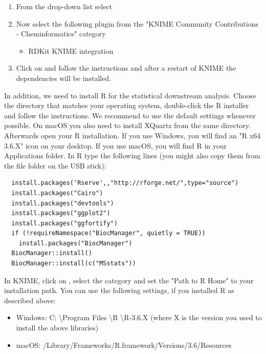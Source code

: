 \begin{enumerate}
\item From the  drop-down list select \\\menu{\KnimeTrustedSite}
\item Now select the following plugin from the "KNIME Community Contributions - Cheminformatics" category 	
    \begin{itemize}
    \item     RDKit KNIME integration
    \end{itemize}	
\item Click on  and follow the instructions and after a restart of KNIME the dependencies will be installed.
\end{enumerate}


\noindent In addition, we need to install R for the statistical downstream analysis. Choose the directory that matches your operating system, double-click the R installer and follow the instructions. We recommend to use the default settings whenever possible. On macOS you also need to install XQuartz from the same directory.\\

\noindent Afterwards open your R installation. If you use Windows, you will find an "R x64 3.6.X" icon on your desktop. If you use macOS, you will find R in your Applications folder. In R type the following lines (you might also copy them from the file  folder on the USB stick):
\begin{code}
\begin{verbatim}
  install.packages('Rserve',,"http://rforge.net/",type="source")
  install.packages("Cairo")
  install.packages("devtools")
  install.packages("ggplot2")
  install.packages("ggfortify")
  if (!requireNamespace("BiocManager", quietly = TRUE))
	install.packages("BiocManager")
  BiocManager::install()
  BiocManager::install(c("MSstats"))
\end{verbatim}
\end{code}

\noindent In KNIME, click on , select the category  and set the "Path to R Home" to your installation path. You can use the following settings, if you installed R as described above:
\begin{itemize}
\item Windows: C: \textbackslash Program Files \textbackslash R \textbackslash R-3.6.X (where X is the version you used to install the above libraries)
\item macOS: /Library/Frameworks/R.framework/Versions/3.6/Resources 
\end{itemize}

